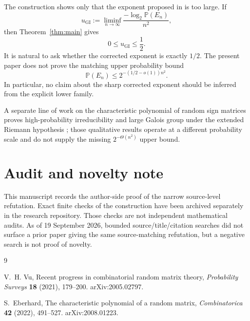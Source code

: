 \documentclass[11pt]{article}
\theoremstyle{remark}
\newcommand{\Pp}{\mathbb P}
\begin{document}
The construction shows only that the exponent proposed in \cite{Vu2021} is too large.  If
\[
 u_{\mathrm{GI}}
 :=\liminf_{n\to\infty}
 \frac{-\log_2\Pp(E_n)}{n^2},
\]
then Theorem~\ref{thm:main} gives
\[
 0\le u_{\mathrm{GI}}\le\frac12.
\]
It is natural to ask whether the corrected exponent is exactly $1/2$.  The present paper does not prove the matching upper probability bound
\[
 \Pp(E_n)\le2^{-(1/2-o(1))n^2}.
\]
In particular, no claim about the sharp corrected exponent should be inferred from the explicit lower family.

A separate line of work on the characteristic polynomial of random sign matrices proves high-probability irreducibility and large Galois group under the extended Riemann hypothesis \cite{Eberhard2022}; those qualitative results operate at a different probability scale and do not supply the missing $2^{-\Theta(n^2)}$ upper bound.

\section*{Audit and novelty note}

This manuscript records the author-side proof of the narrow source-level refutation.  Exact finite checks of the construction have been archived separately in the research repository.  Those checks are not independent mathematical audits.  As of 19 September 2026, bounded source/title/citation searches did not surface a prior paper giving the same source-matching refutation, but a negative search is not proof of novelty.

\begin{thebibliography}{9}

V.~H. Vu,
\newblock Recent progress in combinatorial random matrix theory,
\newblock \emph{Probability Surveys} \textbf{18} (2021), 179--200.
\newblock arXiv:2005.02797.

S.~Eberhard,
\newblock The characteristic polynomial of a random matrix,
\newblock \emph{Combinatorica} \textbf{42} (2022), 491--527.
\newblock arXiv:2008.01223.

\end{thebibliography}
\end{document}
